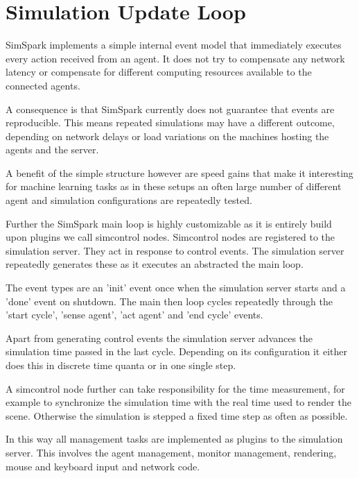\section{Simulation Update Loop}


SimSpark implements a simple internal event model that immediately
executes every action received from an agent. It does not try to
compensate any network latency or compensate for different computing
resources available to the connected agents.

A consequence is that SimSpark currently does not guarantee that
events are reproducible. This means repeated simulations may have a
different outcome, depending on network delays or load variations on
the machines hosting the agents and the server.

A benefit of the simple structure however are speed gains that make it
interesting for machine learning tasks as in these setups an often
large number of different agent and simulation configurations are
repeatedly tested.

Further the SimSpark main loop is highly customizable as it is
entirely build upon plugins we call simcontrol nodes. Simcontrol nodes
are registered to the simulation server. They act in response to
control events. The simulation server repeatedly generates these as it
executes an abstracted the main loop.

The event types are an 'init' event once when the simulation server
starts and a 'done' event on shutdown. The main then loop cycles
repeatedly through the 'start cycle', 'sense agent', 'act agent' and
'end cycle' events.

Apart from generating control events the simulation server advances
the simulation time passed in the last cycle. Depending on its
configuration it either does this in discrete time quanta or in one
single step.

A simcontrol node further can take responsibility for the time
measurement, for example to synchronize the simulation time with the
real time used to render the scene.  Otherwise the simulation is
stepped a fixed time step as often as possible.

In this way all management tasks are implemented as plugins to the
simulation server. This involves the agent management, monitor
management, rendering, mouse and keyboard input and network code.

